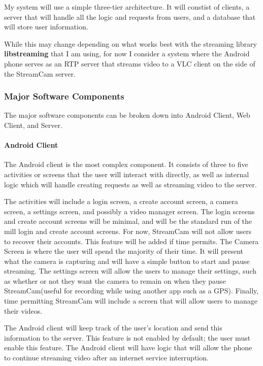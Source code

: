 \documentclass[11pt,a4paper,titlepage]{article}
\begin{document}
My system will use a simple three-tier architecture. It will constist of clients, a server that will handle all the logic and requests from users, and a database that will store user information. 

While this may change depending on what works best with the streaming library \textbf{libstreaming} that I am using, for now I consider a system where the Android phone serves as an RTP server that streams video to a VLC client on the side of the StreamCam server. 

\subsubsection{Major Software Components}
The major software components can be broken down into Android Client, Web Client, and Server. 

\paragraph{Android Client\\}
    The Android client is the most complex component. It consists of three to five activities or screens that the user will interact with directly, as well as internal logic which will handle creating requests as well as streaming video to the server.
    
    The activities will include a login screen, a create account screen, a camera screen, a settings screen, and possibly a video manager screen. The login screens and create account screens will be minimal, and will be the standard run of the mill login and create account screens. For now, StreamCam will not allow users to recover their accounts. This feature will be added if time permits. The Camera Screen is where the user will spend the majority of their time. It will present what the camera is capturing and will have a simple button to start and pause streaming. The settings screen will allow the users to manage their settings, such as whether or not they want the camera to remain on when they pause StreamCam(useful for recording while using another app such as a GPS). Finally, time permitting StreamCam will include a screen that will allow users to manage their videos.
    
    
    The Android client will keep track of the user's location and send this information to the server. This feature is not enabled by default; the user must enable this feature. The Android client will have logic that will allow the phone to continue streaming video after an internet service interruption.
    
\end{document}
